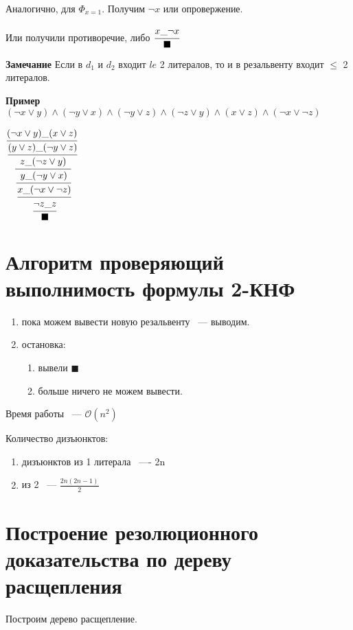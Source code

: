 \documentclass[12pt]{article}
\def\O{\mathcal{O}}
\begin{document}
\begin{description}
Аналогично, для $\Phi_{x = 1}$. Получим $\neg x$ или опровержение.

Или получили противоречие, либо $\cfrac{x\_\neg x}{\blacksquare}$

\item{\bf Замечание} Если в $d_1$ и $d_2$ входит $le$ 2 литералов, то и в резальвенту входит $\le$ 2 литералов.

\item{\bf Пример}
$(\neg x \vee y) \wedge (\neg y \vee x) \wedge (\neg y \vee z) \wedge (\neg z \vee y) \wedge (x \vee z) \wedge (\neg x \vee \neg z)$

$\cfrac{(\neg x \vee y) \_ (x \vee z)}{\cfrac{(y \vee z) \_ (\neg y \vee z)}{\cfrac{z \_ (\neg z \vee y)}{\cfrac{y\_(\neg y \vee x)}{\cfrac{x\_(\neg x \vee \neg z)}{ \cfrac{\neg z \_ z}{\blacksquare} } }}}}$
\end{description}

\section{Алгоритм проверяющий выполнимость формулы 2-КНФ}

\begin{enumerate}
\item пока можем вывести новую резальвенту ~--- выводим.
\item остановка:
\begin{enumerate}
\item вывели $\blacksquare$
\item больше ничего не можем вывести.
\end{enumerate}

\end{enumerate}

Время работы ~--- $\O(n^2)$

Количество дизъюнктов:

\begin{enumerate}
\item дизъюнктов из 1 литерала ~---- 2n
\item из 2 ~--- $\frac{2n(2n - 1)}{2}$
\end{enumerate}

\section{Построение резолюционного доказательства по дереву расщепления}

Построим дерево расщепление. 
\end{document}
